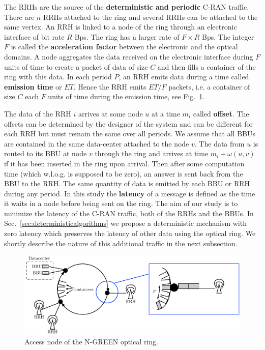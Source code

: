 \documentclass[]{llncs}
\begin{document}
   The RRHs are the source of the {\bf deterministic and periodic} C-RAN traffic.
   There are $n$ RRHs attached to the ring and several RRHs can be attached to the same vertex. An RRH is linked to a node of the ring through an electronic interface of bit rate $R$ Bps.
   The ring has a larger rate of $F\times R$ Bps. The integer $F$ is called the {\bf acceleration factor} between the electronic and the optical domains. A node aggregates the data received on the electronic interface during $F$ units of time to create a packet of data of size $C$ and then fills a container of the ring with this data. 
  In each period $P$, an RRH emits data during a time called \textbf{emission time} or $ET$. Hence the RRH emits $ET / F$ packets, i.e. a container of size $C$ each $F$ units of time during the emission time, see Fig.~\ref{fig:interface}.
   
   The data of the RRH $i$ arrives at some node $u$ at a time $m_i$ called {\bf offset}. The offsets can be determined 
   by the designer of the system and can be different for each RRH but must remain the same over all periods. We assume that all BBUs are contained in the same data-center attached to the node $v$. The data from $u$ is routed to its BBU at node $v$ through the ring and arrives at time $m_i + \omega(u,v)$ if it has been inserted in the ring upon arrival. Then after some computation time (which w.l.o.g. is supposed to be zero), an answer is sent back from the BBU to the RRH. The same quantity of data is emitted by each BBU or RRH during any period.
   In this study the {\bf latency} of a message is defined as the time it waits in a node before being sent on the ring.
   The aim of our study is to minimize the latency of the C-RAN traffic, both of the RRHs and the BBUs. 
   In Sec.~\ref{sec:deterministicalgorithms} we propose a deterministic mechanism with zero latency which preserves the latency of other data using the optical ring. We shortly describe the nature of this additional traffic in the next subsection.
   
    
\begin{figure}[h!]
\begin{center}   

      \includegraphics[scale=0.7]{interface.pdf}
     \caption{Access node of the N-GREEN optical ring.}\label{fig:interface}
     
\end{center}
  \end{figure}
\end{document}
